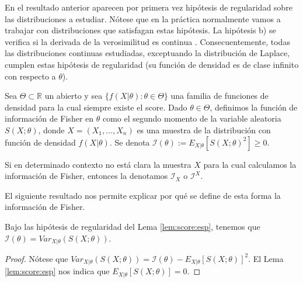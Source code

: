 \documentclass{article}
\begin{document}
    En el resultado anterior aparecen por primera vez hipótesis de regularidad sobre las distribuciones a estudiar. Nótese que en la práctica normalmente vamos a trabajar con distribuciones que satisfagan estas hipótesis. La hipótesis b) se verifica si la derivada de la verosimilitud es continua \cite{leibniz}. Consecuentemente, todas las distribuciones continuas estudiadas, exceptuando la distribución de Laplace, cumplen estas hipótesis de regularidad (su función de densidad es de clase infinito con respecto a $\theta$).

    \begin{definition}
        Sea $\Theta \subset \mathbb{R}$ un abierto y sea $\{f(X|\theta): \theta \in \Theta\}$ una familia de funciones de densidad para la cual siempre existe el score. Dado $\theta \in \Theta$, definimos la función de información de Fisher en $\theta$ como el segundo momento de la variable aleatoria $S(X;\theta)$, donde $X = (X_1, \ldots, X_n)$ es una muestra de la distribución con función de densidad $f(X|\theta)$. Se denota $\mathcal{I}(\theta) := E_{X|\theta}[S(X;\theta)^2] \ge 0.$
    \end{definition}

    Si en determinado contexto no está clara la muestra $X$ para la cual calculamos la información de Fisher, entonces la denotamos $\mathcal{I}_X$ o $\mathcal{I}^X$.

    El siguiente resultado nos permite explicar por qué se define de esta forma la información de Fisher.

    \begin{cor}
        Bajo las hipótesis de regularidad del Lema \ref{lem:score:esp}, tenemos que  $\mathcal{I}(\theta) = Var_{X|\theta}(S(X;\theta))$.
    \end{cor}
    \begin{proof}
        Nótese que $Var_{X|\theta}(S(X;\theta)) = \mathcal{I}(\theta) - E_{X|\theta}[S(X; \theta)]^2$. El Lema \ref{lem:score:esp} nos indica que $E_{X|\theta}[S(X; \theta)] = 0$.
    \end{proof}
\end{document}
